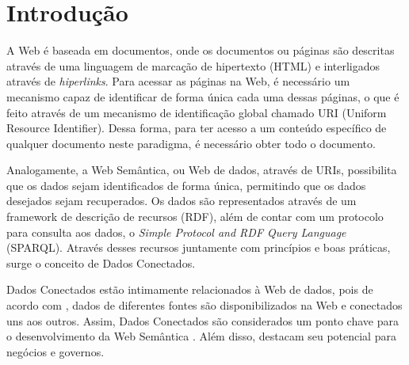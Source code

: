 \chapter{Introdução}
\label{cap:introducao}
A Web é baseada em documentos, onde os documentos ou páginas são descritas através de uma linguagem de marcação de hipertexto (HTML) e interligados através de \textit{hiperlinks}. Para acessar as páginas na Web, é necessário um mecanismo capaz de identificar de forma única cada uma dessas páginas, o que é feito através de um mecanismo de identificação global chamado URI (Uniform Resource Identifier). Dessa forma, para ter acesso a um conteúdo específico de qualquer documento neste paradigma, é necessário obter todo o documento.

Analogamente, a Web Semântica, ou Web de dados, através de URIs, possibilita que os dados sejam identificados de forma única, permitindo que os dados desejados sejam recuperados. Os dados são representados através de um framework de descrição de recursos (RDF), além de contar com um protocolo para consulta aos dados, o \textit{Simple Protocol and RDF Query Language} (SPARQL). Através desses recursos juntamente com princípios e boas práticas, surge o conceito de Dados Conectados.
% 
% 

 
Dados Conectados estão intimamente relacionados à Web de dados, pois de acordo com , dados de diferentes fontes são disponibilizados na Web e conectados uns aos outros. Assim, Dados Conectados são considerados um ponto chave para o desenvolvimento da Web Semântica \cite{berners2001semantic}. Além disso,  destacam seu potencial para negócios e governos.  

